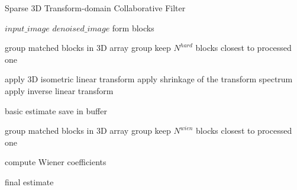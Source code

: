 \begin{algorithm}[h]
	\caption{Sparse 3D Transform-domain Collaborative Filter}\label{alg:bm3ddenoising}
	\begin{algorithmic}[1]
		\Require $input\_image$
		\Ensure $denoised\_image$
		\State form blocks
		
			\State group matched blocks in 3D array group
			\State keep $N^{hard}$ blocks closest to processed one
		\EndFor
		
		\State apply 3D isometric linear transform
		\State apply shrinkage of the transform spectrum
		\State apply inverse linear transform
		
			\State basic estimate
			\State save in buffer
		\EndFor	
		
			\State group matched blocks in 3D array group
			\State keep $N^{wien}$ blocks closest to processed one
		\EndFor
		
		\State compute Wiener coefficients
		
			\State final estimate
		\EndFor		
							
		\EndProcedure
	\end{algorithmic}
\end{algorithm}